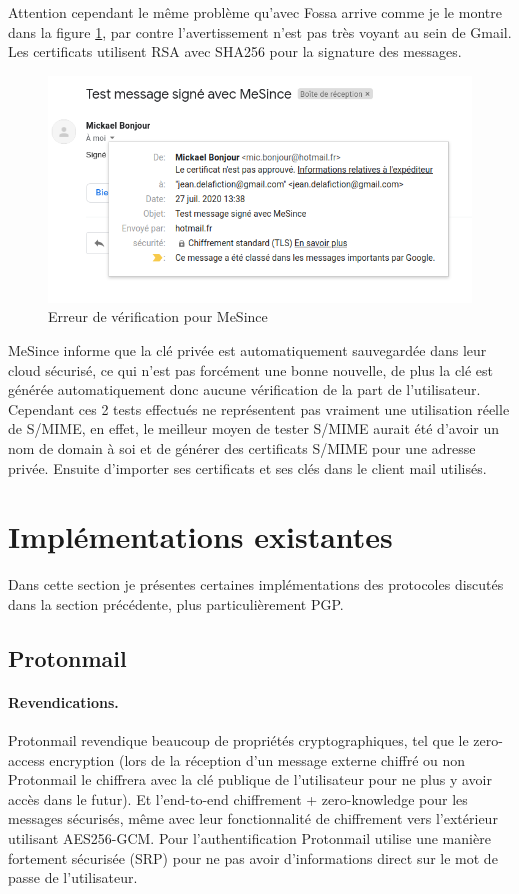 Attention cependant le même problème qu'avec Fossa arrive comme je le montre dans la figure \ref{fig:SMIME_MeSinceProblem}, par contre l'avertissement n'est pas très voyant au sein de Gmail. Les certificats utilisent RSA avec SHA256 pour la signature des messages.
\begin{figure}[h!]
	\includegraphics[width=15cm]{images/mesince_problem.png}
	\centering
	\caption{Erreur de vérification pour MeSince}
	\label{fig:SMIME_MeSinceProblem}
\end{figure}
MeSince informe que la clé privée est automatiquement sauvegardée dans leur cloud sécurisé, ce qui n'est pas forcément une bonne nouvelle, de plus la clé est générée automatiquement donc aucune vérification de la part de l'utilisateur.
Cependant ces 2 tests effectués ne représentent pas vraiment une utilisation réelle de S/MIME, en effet, le meilleur moyen de tester S/MIME aurait été d'avoir un nom de domain à soi et de générer des certificats S/MIME pour une adresse privée. Ensuite d'importer ses certificats et ses clés dans le client mail utilisés.
\section{Implémentations existantes}
Dans cette section je présentes certaines implémentations des protocoles discutés dans la section précédente, plus particulièrement PGP.
\subsection{Protonmail}
\paragraph*{Revendications.}
Protonmail revendique beaucoup de propriétés cryptographiques, tel que le zero-access encryption (lors de la réception d'un message externe chiffré ou non Protonmail le chiffrera avec la clé publique de l'utilisateur pour ne plus y avoir accès dans le futur). Et l’end-to-end chiffrement + zero-knowledge pour les messages sécurisés, même avec leur fonctionnalité de chiffrement vers l'extérieur utilisant AES256-GCM. 
Pour l'authentification Protonmail utilise une manière fortement sécurisée (SRP) pour ne pas avoir d'informations direct sur le mot de passe de l'utilisateur.
